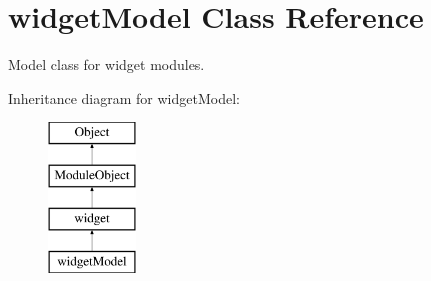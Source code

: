 \hypertarget{classwidgetModel}{\section{widget\+Model Class Reference}
\label{classwidgetModel}
}


Model class for widget modules.  


Inheritance diagram for widget\+Model\+:\begin{figure}[H]
\begin{center}
\leavevmode
\includegraphics[height=4.000000cm]{classwidgetModel}
\end{center}
\end{figure}
